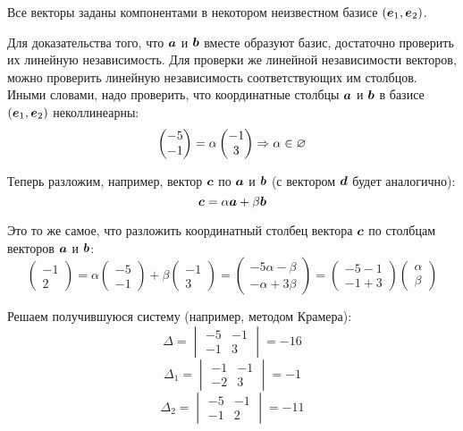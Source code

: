 \documentclass[a4paper,12pt]{article}
\begin{document}
  \begin{solution}
    Все векторы заданы компонентами в некотором неизвестном базисе $(\boldsymbol e_1, \boldsymbol e_2)$.
    
    Для доказательства того, что $\boldsymbol a$ и $\boldsymbol b$ вместе образуют базис, достаточно проверить их линейную независимость.
    Для проверки же линейной независимости векторов, можно проверить линейную независимость соответствующих им столбцов.
    Иными словами, надо проверить, что координатные столбцы $\boldsymbol a$ и $\boldsymbol b$ в базисе $(\boldsymbol e_1, \boldsymbol e_2)$ неколлинеарны:
    \[
      \begin{pmatrix}
        -5 \\ -1
      \end{pmatrix} = \alpha \begin{pmatrix}
        -1 \\ 3
      \end{pmatrix} \Rightarrow \alpha \in \varnothing
    \]
    
    Теперь разложим, например, вектор $\boldsymbol c$ по $\boldsymbol a$ и $\boldsymbol b$ (с вектором $\boldsymbol d$ будет аналогично):
    \[
      \boldsymbol c = \alpha \boldsymbol a + \beta \boldsymbol b
    \]
    
    Это то же самое, что разложить координатный столбец вектора $\boldsymbol c$ по столбцам векторов $\boldsymbol a$ и $\boldsymbol b$:
    \[
      \begin{pmatrix}
        -1 \\ 2
      \end{pmatrix}
      = \alpha \begin{pmatrix}
          -5 \\ -1
        \end{pmatrix}
        + \beta \begin{pmatrix}
          -1 \\ 3
        \end{pmatrix}
      = \begin{pmatrix}
          -5\alpha - \beta\\
          -\alpha + 3\beta
        \end{pmatrix}
      = \begin{pmatrix}
          -5 -1\\
          -1 + 3
        \end{pmatrix}
        \begin{pmatrix}
          \alpha \\ \beta
        \end{pmatrix}
    \]
    
    Решаем получившуюся систему (например, методом Крамера):
    \[
      \Delta = \begin{vmatrix}
        -5 & -1\\
        -1 & 3
      \end{vmatrix} = -16
    \]
    \[
      \Delta_1 = \begin{vmatrix}
        -1 & -1\\
        -2 & 3
      \end{vmatrix} = -1
    \]
    \[
      \Delta_2 = \begin{vmatrix}
        -5 & -1\\
        -1 & 2
      \end{vmatrix} = -11
    \]
    

\end{solution}
\end{document}

